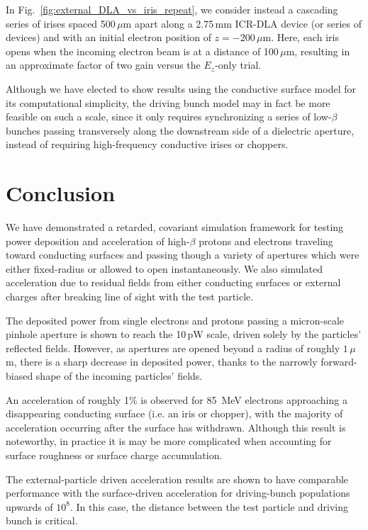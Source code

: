\documentclass[reprint,
               amsmath,amssymb,nofootinbib, aps%
              ]{revtex4-2}
\begin{document}
In Fig.~\ref{fig:external_DLA_vs_iris_repeat}, we consider instead a cascading series of irises spaced 500\,{$\mu$}m apart along a 2.75\,mm ICR-DLA device (or series of devices) and with an initial electron position of $z=-200\,\mu$m. Here, each iris opens when the incoming electron beam is at a distance of 100\,{$\mu$}m, resulting in an approximate factor of two gain versus the $E_z$-only trial.

Although we have elected to show results using the conductive surface model for its computational simplicity, the driving bunch model may in fact be more feasible on such a scale, since it only requires synchronizing a series of low-$\beta$ bunches passing transversely along the downstream side of a dielectric aperture, instead of requiring high-frequency conductive irises or choppers.


\section{Conclusion}
We have demonstrated a retarded, covariant simulation framework for testing power deposition and acceleration of high-$\beta$ protons and electrons traveling toward conducting surfaces and passing though a variety of apertures which were either fixed-radius or allowed to open instantaneously. We also simulated acceleration due to residual fields from either conducting surfaces or external charges after breaking line of sight with the test particle.

The deposited power from single electrons and protons passing a micron-scale pinhole aperture is shown to reach the 10\,pW scale, driven solely by the particles' reflected fields. However, as apertures are opened beyond a radius of roughly $1\,\mu$m, there is a sharp decrease in deposited power, thanks to the narrowly forward-biased shape of the incoming particles' fields.

An acceleration of roughly 1\% is observed for 85~MeV electrons approaching a disappearing conducting surface (i.e. an iris or chopper), with the majority of acceleration occurring after the surface has withdrawn. Although this result is noteworthy, in practice it is may be more complicated when accounting for surface roughness or surface charge accumulation.

The external-particle driven acceleration results are shown to have comparable performance with the surface-driven acceleration for driving-bunch populations upwards of $10^8$. In this case, the distance between the test particle and driving bunch is critical.
\end{document}
